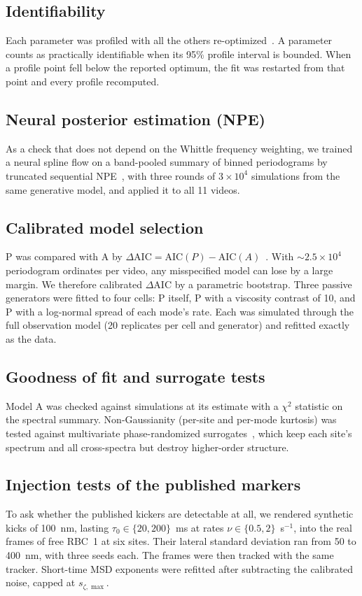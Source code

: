 \documentclass[conference]{IEEEtran}
\begin{document}
\subsection{Identifiability}
Each parameter was profiled with all the others re-optimized~\cite{raue2009}. A parameter counts as
practically identifiable when its 95\% profile interval is bounded. When a profile point fell below
the reported optimum, the fit was restarted from that point and every profile recomputed.

\subsection{Neural posterior estimation (NPE)}
As a check that does not depend on the Whittle frequency weighting, we trained a neural spline flow
on a band-pooled summary of binned periodograms by truncated sequential NPE~\cite{deistler2022},
with three rounds of $3\times10^4$ simulations from the same generative model, and applied it to
all 11 videos.

\subsection{Calibrated model selection}
P was compared with A by $\Delta\mathrm{AIC} = \mathrm{AIC}(P) - \mathrm{AIC}(A)$~\cite{akaike1974}.
With $\sim2.5\times10^4$ periodogram ordinates per video, any misspecified model can lose by a large
margin. We therefore calibrated $\Delta$AIC by a parametric bootstrap. Three passive generators
were fitted to four cells: P itself, P with a viscosity contrast of 10, and P with a log-normal
spread of each mode's rate. Each was simulated through the full observation model (20 replicates per
cell and generator) and refitted exactly as the data.

\subsection{Goodness of fit and surrogate tests}
Model A was checked against simulations at its estimate with a $\chi^2$ statistic on the spectral
summary. Non-Gaussianity (per-site and per-mode kurtosis) was tested against multivariate
phase-randomized surrogates~\cite{prichard1994}, which keep each site's spectrum and all
cross-spectra but destroy higher-order structure.

\subsection{Injection tests of the published markers}
To ask whether the published kickers are detectable at all, we rendered synthetic kicks of 100~nm,
lasting $\tau_0 \in \{20, 200\}$~ms at rates $\nu \in \{0.5, 2\}$~s$^{-1}$, into the real frames of
free RBC~1 at six sites. Their lateral standard deviation ran from 50 to 400~nm, with three seeds
each. The frames were then tracked with the same tracker. Short-time MSD exponents were refitted
after subtracting the calibrated noise, capped at $s_{\zeta,\max}$.
\end{document}
